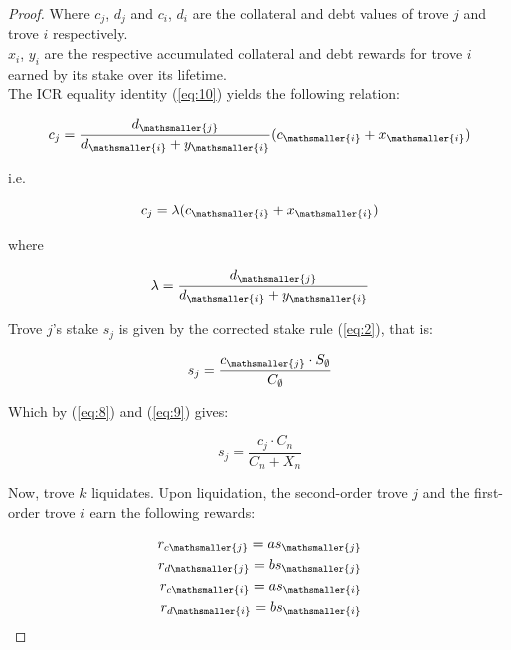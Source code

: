 \documentclass[reqno]{article}
\begin{document}
\begin{proof}
\bigskip
Where $c_j$, $d_j$ and $c_i$, $d_i$ are the collateral and debt values of trove $j$ and trove $i$ respectively.\\

$x_i$, $y_i$ are the respective accumulated collateral and debt rewards for trove $i$ earned by its stake over its lifetime.\\

The ICR equality identity (\ref{eq:10}) yields the following relation:

\begin{equation} 
        c_j=\frac{d_\mathsmaller{j}}{d_\mathsmaller{i}+y_\mathsmaller{i}}(c_\mathsmaller{i}+x_\mathsmaller{i})
\end{equation}

\bigskip
i.e.

\begin{equation} \label{eq:14}
    c_j=\lambda(c_\mathsmaller{i}+x_\mathsmaller{i})
\end{equation}

\bigskip
where

\begin{equation} \label{eq:15}
    \lambda=\frac{d_\mathsmaller{j}}{d_\mathsmaller{i}+y_\mathsmaller{i}}
\end{equation}


\bigskip
Trove $j$’s stake $s_j$ is given by the corrected stake rule (\ref{eq:2}), that is:

\begin{equation} 
    s_j=\frac{c_\mathsmaller{j} \cdot S_\emptyset}{C_\emptyset}
\end{equation}

\bigskip
Which by (\ref{eq:8}) and (\ref{eq:9}) gives:

\begin{equation} \label{eq:17}
    s_j=\frac{c_j \cdot C_n}{C_n+X_n}
\end{equation}

\bigskip
Now, trove $k$ liquidates. Upon liquidation, the second-order trove $j$ and the first-order trove $i$ earn the following rewards:

\begin{equation} \label{eq:20}
    \begin{split}
        r_{c\mathsmaller{j}}=as_\mathsmaller{j}\\
        r_{d\mathsmaller{j}}=bs_\mathsmaller{j}\\
        r_{c\mathsmaller{i}}=as_\mathsmaller{i}\\
        r_{d\mathsmaller{i}}=bs_\mathsmaller{i}
    \end{split}
\end{equation}


\end{proof}
\end{document}
